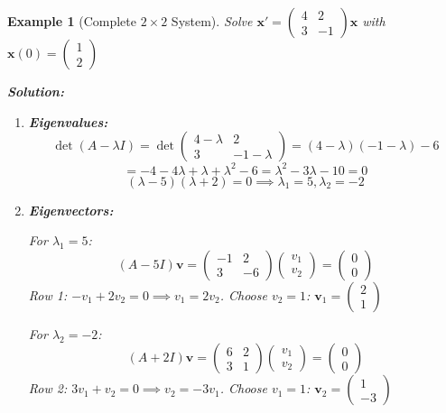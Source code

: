 \documentclass[12pt]{article}
\newtheorem{example}{Example}
\begin{document}
\begin{example}[Complete $2\times2$ System]
Solve $\mathbf{x}' = \begin{pmatrix} 4 & 2 \\ 3 & -1 \end{pmatrix}\mathbf{x}$ with $\mathbf{x}(0) = \begin{pmatrix} 1 \\ 2 \end{pmatrix}$

\textbf{Solution:}
\begin{enumerate}
\item \textbf{Eigenvalues:}
\[\det(A - \lambda I) = \det\begin{pmatrix} 4-\lambda & 2 \\ 3 & -1-\lambda \end{pmatrix} = (4-\lambda)(-1-\lambda) - 6\]
\[= -4 - 4\lambda + \lambda + \lambda^{2} - 6 = \lambda^{2} - 3\lambda - 10 = 0\]
\[(\lambda - 5)(\lambda + 2) = 0 \implies \lambda_{1} = 5, \lambda_{2} = -2\]

\item \textbf{Eigenvectors:}

For $\lambda_{1} = 5$:
\[(A - 5I)\mathbf{v} = \begin{pmatrix} -1 & 2 \\ 3 & -6 \end{pmatrix}\begin{pmatrix} v_{1} \\ v_{2} \end{pmatrix} = \begin{pmatrix} 0 \\ 0 \end{pmatrix}\]
Row 1: $-v_{1} + 2v_{2} = 0 \implies v_{1} = 2v_{2}$. Choose $v_{2} = 1$: $\mathbf{v}_{1} = \begin{pmatrix} 2 \\ 1 \end{pmatrix}$

For $\lambda_{2} = -2$:
\[(A + 2I)\mathbf{v} = \begin{pmatrix} 6 & 2 \\ 3 & 1 \end{pmatrix}\begin{pmatrix} v_{1} \\ v_{2} \end{pmatrix} = \begin{pmatrix} 0 \\ 0 \end{pmatrix}\]
Row 2: $3v_{1} + v_{2} = 0 \implies v_{2} = -3v_{1}$. Choose $v_{1} = 1$: $\mathbf{v}_{2} = \begin{pmatrix} 1 \\ -3 \end{pmatrix}$


\end{enumerate}
\end{example}
\end{document}
